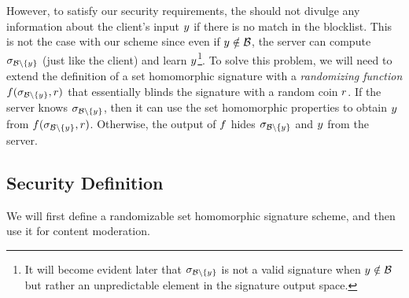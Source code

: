  However, to satisfy our security requirements, the \contentToken should not divulge any information about the client's input $\genericCInputElmt$ if there is no match in the blocklist. This is not the case with our scheme since even if $\genericCInputElmt \notin \blocklist$, the server can compute $\genericSig[\blocklist \setminus \{\genericCInputElmt\}]$ (just like the client) and learn $\genericCInputElmt$\footnote{It will become evident later that $\genericSig[\blocklist \setminus \{\genericCInputElmt\}]$ is not a valid signature when $\genericCInputElmt \notin \blocklist$ but rather an unpredictable element in the signature output space.}.
To solve this problem, we will need to extend the definition of a set homomorphic signature with a \textit{randomizing function} $\randomizeFn(\genericSig[\blocklist \setminus \{\genericCInputElmt\}], \genericRand)$
that essentially blinds the signature with a 
random coin $\genericRand$. If the server knows $\genericSig[\blocklist \setminus \{\genericCInputElmt\}]$, then it can use the set 
homomorphic properties to obtain $\genericCInputElmt$ from $\randomizeFn(\genericSig[\blocklist \setminus \{\genericCInputElmt\}], \genericRand)$. Otherwise, the output of $\randomizeFn$ hides $\genericSig[\blocklist \setminus \{\genericCInputElmt\}]$ and $\genericCInputElmt$ from the server. 
\fi 





\subsection{Security Definition}
%
We will first define a randomizable set homomorphic signature scheme, and then use it for content moderation. 

